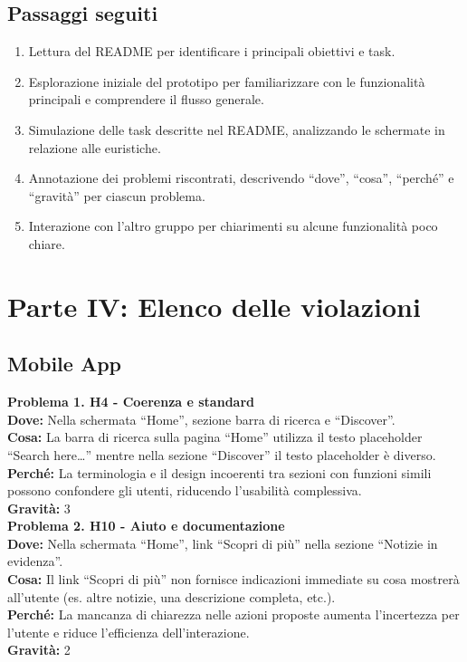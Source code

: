 \documentclass[a4paper,12pt]{article}
\begin{document}
\subsection*{Passaggi seguiti}
\begin{enumerate}
    \item Lettura del README per identificare i principali obiettivi e task.
    \item Esplorazione iniziale del prototipo per familiarizzare con le funzionalità principali e comprendere il flusso generale.
    \item Simulazione delle task descritte nel README, analizzando le schermate in relazione alle euristiche.
    \item Annotazione dei problemi riscontrati, descrivendo “dove”, “cosa”, “perché” e “gravità” per ciascun problema.
    \item Interazione con l’altro gruppo per chiarimenti su alcune funzionalità poco chiare.
\end{enumerate}

\section*{Parte IV: Elenco delle violazioni}

\subsection*{Mobile App}

\textbf{Problema 1. H4 - Coerenza e standard} \\
\textbf{Dove:} Nella schermata “Home”, sezione barra di ricerca e “Discover”. \\
\textbf{Cosa:} La barra di ricerca sulla pagina “Home” utilizza il testo placeholder “Search here…” mentre nella sezione “Discover” il testo placeholder è diverso. \\
\textbf{Perché:} La terminologia e il design incoerenti tra sezioni con funzioni simili possono confondere gli utenti, riducendo l’usabilità complessiva. \\
\textbf{Gravità:} 3 \\[1em]

\textbf{Problema 2. H10 - Aiuto e documentazione} \\
\textbf{Dove:} Nella schermata “Home”, link “Scopri di più” nella sezione “Notizie in evidenza”. \\
\textbf{Cosa:} Il link “Scopri di più” non fornisce indicazioni immediate su cosa mostrerà all’utente (es. altre notizie, una descrizione completa, etc.). \\
\textbf{Perché:} La mancanza di chiarezza nelle azioni proposte aumenta l’incertezza per l’utente e riduce l’efficienza dell’interazione. \\
\textbf{Gravità:} 2 \\[1em]
\end{document}
